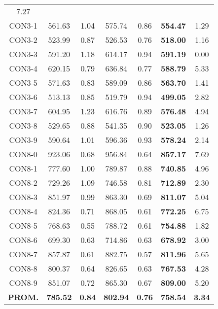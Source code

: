 \begin{table}[h]
\begin{tabular}{c c c c c c c}
7.27\\CON3-1 & 561.63 & 1.04 & 
575.74 & 0.86 & \bf{554.47} & 
1.29\\CON3-2 & 523.99 & 0.87 & 
526.53 & 0.76 & \bf{518.00} & 
1.16\\CON3-3 & 591.20 & 1.18 & 
614.17 & 0.94 & \bf{591.19} & 
0.00\\CON3-4 & 620.15 & 0.79 & 
636.84 & 0.77 & \bf{588.79} & 
5.33\\CON3-5 & 571.63 & 0.83 & 
589.09 & 0.86 & \bf{563.70} & 
1.41\\CON3-6 & 513.13 & 0.85 & 
519.79 & 0.94 & \bf{499.05} & 
2.82\\CON3-7 & 604.95 & 1.23 & 
616.76 & 0.89 & \bf{576.48} & 
4.94\\CON3-8 & 529.65 & 0.88 & 
541.35 & 0.90 & \bf{523.05} & 
1.26\\CON3-9 & 590.64 & 1.01 & 
596.36 & 0.93 & \bf{578.24} & 
2.14\\CON8-0 & 923.06 & 0.68 & 
956.84 & 0.64 & \bf{857.17} & 
7.69\\CON8-1 & 777.60 & 1.00 & 
789.87 & 0.88 & \bf{740.85} & 
4.96\\CON8-2 & 729.26 & 1.09 & 
746.58 & 0.81 & \bf{712.89} & 
2.30\\CON8-3 & 851.97 & 0.99 & 
863.30 & 0.69 & \bf{811.07} & 
5.04\\CON8-4 & 824.36 & 0.71 & 
868.05 & 0.61 & \bf{772.25} & 
6.75\\CON8-5 & 768.63 & 0.55 & 
788.72 & 0.61 & \bf{754.88} & 
1.82\\CON8-6 & 699.30 & 0.63 & 
714.86 & 0.63 & \bf{678.92} & 
3.00\\CON8-7 & 857.87 & 0.61 & 
882.75 & 0.57 & \bf{811.96} & 
5.65\\CON8-8 & 800.37 & 0.64 & 
826.65 & 0.63 & \bf{767.53} & 
4.28\\CON8-9 & 851.07 & 0.72 & 
865.30 & 0.67 & \bf{809.00} & 
5.20\\\bf{PROM.} & 
\bf{785.52} & \bf{0.84} & \bf{802.94} & \bf{0.76} & \bf{758.54} & \bf{3.34}\\[1ex]\hline
\end{tabular}
\label{table:ILS-VND-M-5-40}
\end{table}

